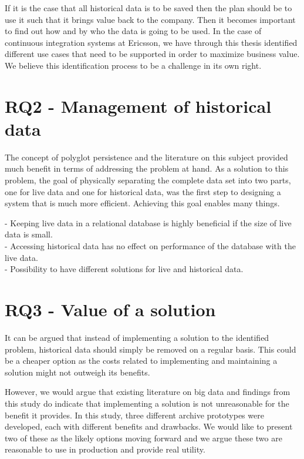 If it is the case that all historical data is to be saved then the plan should be to use it such that it brings value back to the company. Then it becomes important to find out how and by who the data is going to be used. In the case of continuous integration systems at Ericsson, we have through this thesis identified different use cases that need to be supported in order to maximize business value. We believe this identification process to be a challenge in its own right.

\section{RQ2 - Management of historical data}
The concept of polyglot persistence and the literature on this subject provided much benefit in terms of addressing the problem at hand. As a solution to this problem, the goal of physically separating the complete data set into two parts, one for live data and one for historical data, was the first step to designing a system that is much more efficient. Achieving this goal enables many things. 

- Keeping live data in a relational database is highly beneficial if the size of live data is small. \\
- Accessing historical data has no effect on performance of the database with the live data. \\
- Possibility to have different solutions for live and historical data. \\

\section{RQ3 - Value of a solution}
It can be argued that instead of implementing a solution to the identified problem, historical data should simply be removed on a regular basis. This could be a cheaper option as the costs related to implementing and maintaining a solution might not outweigh its benefits. 

However, we would argue that existing literature on big data and findings from this study do indicate that implementing a solution is not unreasonable for the benefit it provides. In this study, three different archive prototypes were developed, each with different benefits and drawbacks. We would like to present two of these as the likely options moving forward and we argue these two are reasonable to use in production and provide real utility.

